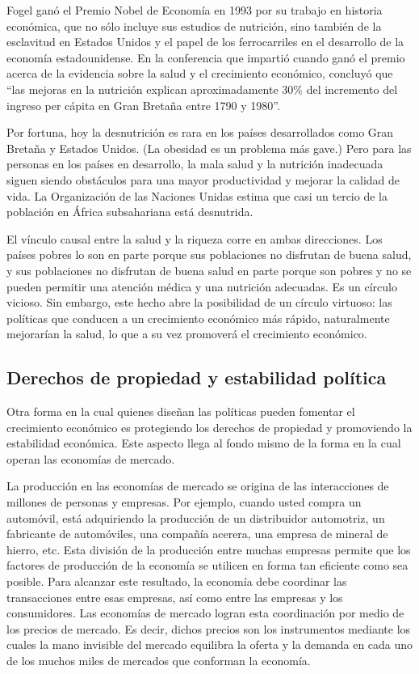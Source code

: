 \documentclass[
]{krantz}
\begin{document}
Fogel ganó el Premio Nobel de Economía en 1993 por su trabajo en historia económica, que no sólo incluye sus estudios de nutrición, sino también de la esclavitud en Estados Unidos y el papel de los ferrocarriles en el desarrollo de la economía estadounidense. En la conferencia que impartió cuando ganó el premio acerca de la evidencia sobre la salud y el crecimiento económico, concluyó que ``las mejoras en la nutrición explican aproximadamente 30\% del incremento del ingreso per cápita en Gran Bretaña entre 1790 y 1980''.

Por fortuna, hoy la desnutrición es rara en los países desarrollados como Gran Bretaña y Estados Unidos. (La obesidad es un problema más gave.) Pero para las personas en los países en desarrollo, la mala salud y la nutrición inadecuada siguen siendo obstáculos para una mayor productividad y mejorar la calidad de vida. La Organización de las Naciones Unidas estima que casi un tercio de la población en África subsahariana está desnutrida.

El vínculo causal entre la salud y la riqueza corre en ambas direcciones. Los países pobres lo son en parte porque sus poblaciones no disfrutan de buena salud, y sus poblaciones no disfrutan de buena salud en parte porque son pobres y no se pueden permitir una atención médica y una nutrición adecuadas. Es un círculo vicioso. Sin embargo, este hecho abre la posibilidad de un círculo virtuoso: las políticas que conducen a un crecimiento económico más rápido, naturalmente mejorarían la salud, lo que a su vez promoverá el crecimiento económico.

\hypertarget{derechos-de-propiedad-y-estabilidad-poluxedtica}{%
\subsection{Derechos de propiedad y estabilidad política}\label{derechos-de-propiedad-y-estabilidad-poluxedtica}}

Otra forma en la cual quienes diseñan las políticas pueden fomentar el crecimiento económico es protegiendo los derechos de propiedad y promoviendo la estabilidad económica. Este aspecto llega al fondo mismo de la forma en la cual operan las economías de mercado.

La producción en las economías de mercado se origina de las interacciones de millones de personas y empresas. Por ejemplo, cuando usted compra un automóvil, está adquiriendo la producción de un distribuidor automotriz, un fabricante de automóviles, una compañía acerera, una empresa de mineral de hierro, etc. Esta división de la producción entre muchas empresas permite que los factores de producción de la economía se utilicen en forma tan eficiente como sea posible. Para alcanzar este resultado, la economía debe coordinar las transacciones entre esas empresas, así como entre las empresas y los consumidores. Las economías de mercado logran esta coordinación por medio de los precios de mercado. Es decir, dichos precios son los instrumentos mediante los cuales la mano invisible del mercado equilibra la oferta y la demanda en cada uno de los muchos miles de mercados que conforman la economía.
\end{document}
